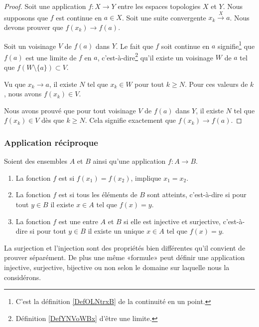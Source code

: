 \begin{proof}
    Soit une application \( f\colon X\to Y\) entre les espaces topologies \( X\) et \( Y\). Nous supposons que \( f\) est continue en \( a\in X\). Soit une suite convergente \( x_k\stackrel{X}{\longrightarrow}a\). Nous devons prouver que \( f(x_k)\to f(a)\).

    Soit un voisinage \( V\) de \( f(a)\) dans \( Y\). Le fait que \( f\) soit continue en \( a\) signifie\footnote{C'est la définition \ref{DefOLNtrxB} de la continuité en un point.} que \( f(a)\) est une limite de \( f\) en \( a\), c'est-à-dire\footnote{Définition \ref{DefYNVoWBx} d'être une limite.} qu'il existe un voisinage \( W\) de \( a\) tel que \( f(W\setminus\{ a \})\subset V\).

    Vu que \( x_k\to a\), il existe \( N\) tel que \( x_k\in W\) pour tout \( k\geq N\). Pour ces valeurs de \( k\), nous avons \( f(x_k)\in V\).

    Nous avons prouvé que pour tout voisinage \( V\) de \( f(a)\) dans \( Y\), il existe \( N\) tel que \( f(x_k)\in V\) dès que \( k\geq N\). Cela signifie exactement que \( f(x_k)\to f(a)\).
\end{proof}


\subsubsection{Application réciproque}

\begin{definition}        \label{DEFooBFCQooPyKvRK}
    Soient des ensembles \( A\) et \( B\) ainsi qu'une application \( f\colon A\to B\).
    \begin{enumerate}
        \item
            La fonction \( f\) est  si \( f(x_1)=f(x_2)\), implique \( x_1=x_2\).
        \item
            La fonction \( f\) est  si tous les éléments de \( B\) sont atteints, c'est-à-dire si pour tout \( y\in B\) il existe \( x\in A\) tel que \( f(x)=y\).
        \item
            La fonction \( f\) est une  entre \( A\) et \( B\) si elle est injective et surjective, c'est-à-dire si pour tout \( y\in B\) il existe un unique \( x\in A\) tel que \( f(x)=y\).
    \end{enumerate}
\end{definition}
La surjection et l'injection sont des propriétés bien différentes qu'il convient de prouver séparément. De plus une même «formule» peut définir une application injective, surjective, bijective ou non selon le domaine sur laquelle nous la considérons.

